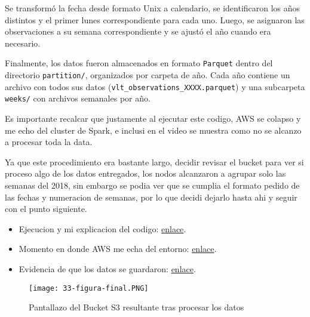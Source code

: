 \documentclass[12pt,letterpaper,twoside]{article}
\begin{document}
Se transformó la fecha desde formato Unix a calendario, se identificaron los años distintos y el primer lunes correspondiente para cada uno. Luego, se asignaron las observaciones a su semana correspondiente y se ajustó el año cuando era necesario.

Finalmente, los datos fueron almacenados en formato \texttt{Parquet} dentro del directorio \texttt{partition/}, organizados por carpeta de año. Cada año contiene un archivo con todos sus datos (\texttt{vlt\_observations\_XXXX.parquet}) y una subcarpeta \texttt{weeks/} con archivos semanales por año.

Es importante recalcar que justamente al ejecutar este codigo, AWS se colapso y me echo del cluster de Spark, e inclusi en el video se muestra como no se alcanzo a procesar toda la data.

Ya que este procedimiento era bastante largo, decidir revisar el bucket para ver si proceso algo de los datos entregados, los nodos alcanzaron a agrupar solo las semanas del 2018, sin embargo se podia
ver que se cumplia el formato pedido de las fechas y numeracion de semanas, por lo que decidi dejarlo hasta ahi y seguir con el punto siguiente.

\begin{itemize}
  \item Ejecucion y mi explicacion del codigo: {\color{blue}\href{https://youtu.be/GdrpnyFULTI?si=vEHhc2fKoWvcQzTY&t=547}{enlace}}.
  \item Momento en donde AWS me echa del entorno: {\color{blue}\href{https://youtu.be/GdrpnyFULTI?si=wfYQl2w1CQLTAboK&t=686}{enlace}}.
  \item Evidencia de que los datos se guardaron: {\color{blue}\href{https://youtu.be/GdrpnyFULTI?si=1imVLcvU_TyfZjSQ&t=940}{enlace}}.
\end{itemize}

\begin{figure}[H]
    \centering
    \texttt{[image: 33-figura-final.PNG]}
    \caption{Pantallazo del Bucket S3 resultante tras procesar los datos}
\end{figure}

\newpage

\begin{code}[H]
    
\end{code}

\newpage
\end{document}
